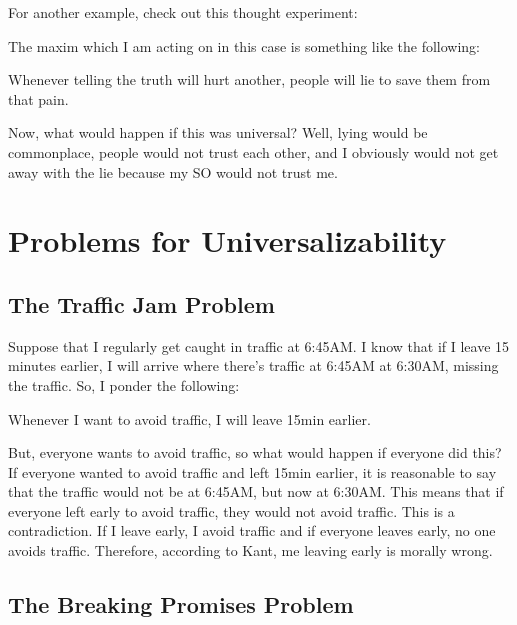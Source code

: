 For another example, check out this thought experiment:


The maxim which I am acting on in this case is something like the following:
\begin{center}
Whenever telling the truth will hurt another, people will lie to save them from that pain.
\end{center}
Now, what would happen if this was universal? Well, lying would be commonplace, people would not trust each other, and I obviously would not get away with the lie because my SO would not trust me.
\section{Problems for Universalizability}
\subsection{The Traffic Jam Problem}

Suppose that I regularly get caught in traffic at 6:45AM. I know that if I leave 15 minutes earlier, I will arrive where there’s traffic at 6:45AM at 6:30AM, missing the traffic. So, I ponder the following:
\begin{center}
    Whenever I want to avoid traffic, I will leave 15min earlier.
\end{center}
But, everyone wants to avoid traffic, so what would happen if everyone did this? If everyone wanted to avoid traffic and left 15min earlier, it is reasonable to say that the traffic would not be at 6:45AM, but now at 6:30AM. This means that if everyone left early to avoid traffic, they would not avoid traffic. This is a contradiction. If I leave early, I avoid traffic and if everyone leaves early, no one avoids traffic. Therefore, according to Kant, me leaving early is morally wrong.
\subsection{The Breaking Promises Problem}

